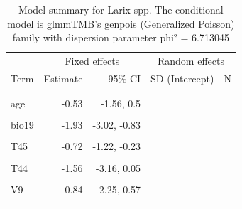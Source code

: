 \documentclass[
]{article}
\begin{document}
\begin{longtable}[t]{lrrrr}
\caption{\label{tab:summaries-tables}\label{tab:L}Model summary for Larix spp. The conditional model is glmmTMB's genpois (Generalized Poisson) family with dispersion parameter phi² = 6.713045}\\
\toprule
\multicolumn{1}{c}{ } & \multicolumn{2}{c}{Fixed effects} & \multicolumn{2}{c}{Random effects} \\
\cmidrule(l{3pt}r{3pt}){2-3} \cmidrule(l{3pt}r{3pt}){4-5}
Term & Estimate & 95\% CI & SD (Intercept) & N\\
\midrule
\addlinespace[0.3em]
\multicolumn{5}{l}{\textbf{Conditional model}}\\
\hspace{1em}\cellcolor{gray!6}{Intercept} & \cellcolor{gray!6}{-4.78} & \cellcolor{gray!6}{-5.44, -4.12} & \cellcolor{gray!6}{} & \cellcolor{gray!6}{}\\
\hspace{1em}age & -0.53 & -1.56, 0.5 &  & \\
\hspace{1em}\cellcolor{gray!6}{bio01} & \cellcolor{gray!6}{-1.90} & \cellcolor{gray!6}{-2.67, -1.13} & \cellcolor{gray!6}{} & \cellcolor{gray!6}{}\\
\hspace{1em}bio19 & -1.93 & -3.02, -0.83 &  & \\
\hspace{1em}\cellcolor{gray!6}{relelev} & \cellcolor{gray!6}{0.48} & \cellcolor{gray!6}{0.39, 0.57} & \cellcolor{gray!6}{} & \cellcolor{gray!6}{}\\
\hspace{1em}T45 & -0.72 & -1.22, -0.23 &  & \\
\hspace{1em}\cellcolor{gray!6}{artificial} & \cellcolor{gray!6}{2.30} & \cellcolor{gray!6}{2, 2.6} & \cellcolor{gray!6}{} & \cellcolor{gray!6}{}\\
\hspace{1em}T44 & -1.56 & -3.16, 0.05 &  & \\
\hspace{1em}\cellcolor{gray!6}{T32} & \cellcolor{gray!6}{0.56} & \cellcolor{gray!6}{0.22, 0.89} & \cellcolor{gray!6}{} & \cellcolor{gray!6}{}\\
\hspace{1em}V9 & -0.84 & -2.25, 0.57 &  & \\
\hspace{1em}\cellcolor{gray!6}{T34} & \cellcolor{gray!6}{1.06} & \cellcolor{gray!6}{0.62, 1.5} & \cellcolor{gray!6}{} & \cellcolor{gray!6}{}\\

\end{longtable}
\end{document}
